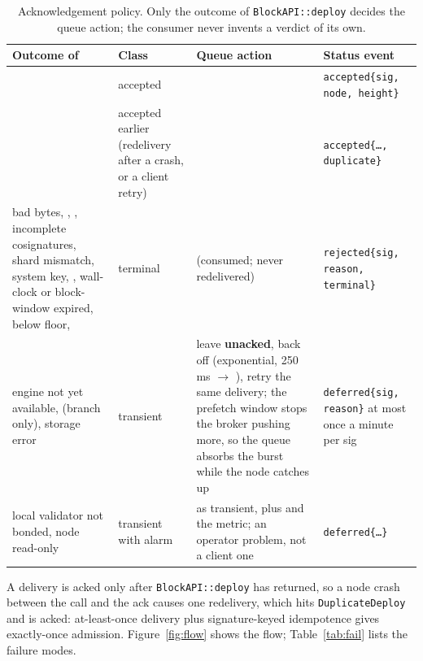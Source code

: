 \documentclass[11pt]{article}
\newcommand{\code}[1]{\texttt{#1}}
\begin{document}
\begin{table}[htbp]
\centering\small
\begin{tabularx}{\textwidth}{X L{2.2cm} L{4.4cm} L{3.2cm}}
\toprule
Outcome of  & Class & Queue action & Status event \\
\midrule
{} & accepted &  & \code{accepted\{sig, node, height\}} \\
 & accepted earlier (redelivery after a crash, or a client retry) &  & \code{accepted\{\ldots, duplicate\}} \\
bad bytes, , , incomplete cosignatures, shard mismatch, system key, , wall-clock or block-window expired,  below floor,  & terminal &  (consumed; never redelivered) & \code{rejected\{sig, reason, terminal\}} \\
engine not yet available,  (branch only), storage error & transient & leave \textbf{unacked}, back off (exponential, 250\,ms $\to$ ), retry the same delivery; the prefetch window stops the broker pushing more, so the queue absorbs the burst while the node catches up & \code{deferred\{sig, reason\}} at most once a minute per sig \\
local validator not bonded, node read-only & transient with alarm & as transient, plus  and the  metric; an operator problem, not a client one & \code{deferred\{\ldots\}} \\
\bottomrule
\end{tabularx}
\caption{Acknowledgement policy. Only the outcome of \code{BlockAPI::deploy} decides
the queue action; the consumer never invents a verdict of its own.}
\label{tab:ack}
\end{table}

A delivery is acked only after \code{BlockAPI::deploy} has returned, so a node crash
between the call and the ack causes one redelivery, which hits \code{DuplicateDeploy}
and is acked: at-least-once delivery plus signature-keyed idempotence gives
exactly-once admission. Figure~\ref{fig:flow} shows the flow; Table~\ref{tab:fail}
lists the failure modes.
\end{document}
